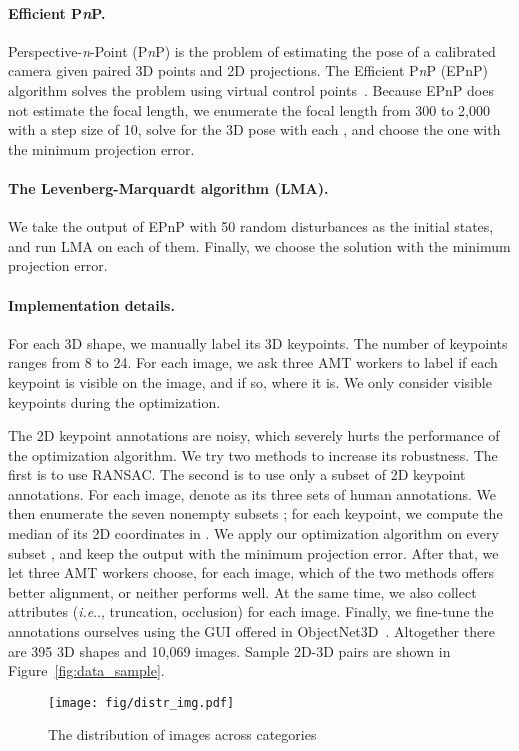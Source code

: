 \documentclass[10pt,twocolumn,letterpaper]{article}
\makeatletter
\newcommand{\fig}[1]{Figure~\ref{#1}}
\DeclareRobustCommand\onedot{\futurelet\@let@token\@onedot}
\def\@onedot{\ifx\@let@token.\else.\null\fi\xspace}
\def\ie{\emph{i.e}\onedot} \def\Ie{\emph{I.e}\onedot}
\newcommand{\myparagraph}[1]{\vspace{-14pt}\paragraph{#1}}
\makeatother
\begin{document}
\myparagraph{Efficient P\textit{n}P.}

Perspective-\textit{n}-Point (P\textit{n}P) is the problem of estimating the pose of a calibrated camera given paired 3D points and 2D projections. The Efficient P\textit{n}P (EPnP) algorithm solves the problem using virtual control points~\cite{levenberg1944method}. Because EPnP does not estimate the focal length, we enumerate the focal length  from 300 to 2,000 with a step size of 10, solve for the 3D pose with each , and choose the one with the minimum projection error.

\myparagraph{The Levenberg-Marquardt algorithm (LMA).}

We take the output of EPnP with 50 random disturbances as the initial states, and run LMA on each of them. Finally, we choose the solution with the minimum projection error.

\myparagraph{Implementation details.}

For each 3D shape, we manually label its 3D keypoints. The number of keypoints ranges from 8 to 24. For each image, we ask three AMT workers to label if each keypoint is visible on the image, and if so, where it is. We only consider visible keypoints during the optimization.

The 2D keypoint annotations are noisy, which severely hurts the performance of the optimization algorithm. We try two methods to increase its robustness. The first is to use RANSAC. The second is to use only a subset of 2D keypoint annotations. For each image, denote  as its three sets of human annotations. We then enumerate the seven nonempty subsets ; for each keypoint, we compute the median of its 2D coordinates in . We apply our optimization algorithm on every subset , and keep the output with the minimum projection error. After that, we let three AMT workers choose, for each image, which of the two methods offers better alignment, or neither performs well. At the same time, we also collect attributes (\ie, truncation, occlusion) for each image. Finally, we fine-tune the annotations ourselves using the GUI offered in ObjectNet3D~\cite{Xiang2016Objectnet3d:}. Altogether there are 395 3D shapes and 10,069 images. Sample 2D-3D pairs are shown in \fig{fig:data_sample}.

 
\begin{figure}[t!]
\centering
\texttt{[image: fig/distr\_img.pdf]}
\vspace{-20pt}
\caption{The distribution of images across categories}
\vspace{-20pt}
\label{fig:distr_img}
\end{figure}
 
\end{document}
